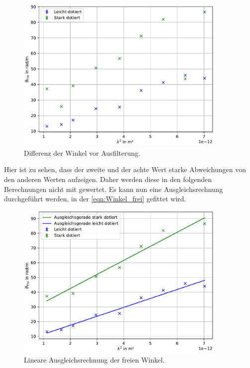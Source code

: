 \begin{figure}[H]
    \centering
    \includegraphics[width=0.9\textwidth]{../Rohplot.pdf}
    \caption{Differenz der Winkel vor Ausfilterung.}
    \label{fig:pre}
\end{figure}

\noindent Hier ist zu sehen, dass der zweite und der achte Wert starke Abweichungen von den anderen Werten 
aufzeigen. Daher werden diese in den folgenden Berechnungen nicht mit gewertet. Es kann nun eine Ausgleichsrechnung 
durchgeführt werden, in der \autoref{eqn:Winkel_frei} gefittet wird. 

\begin{figure}[H]
    \centering
    \includegraphics[width=0.9\textwidth]{../LinRegress.pdf}
    \caption{Lineare Ausgleichsrechnung der freien Winkel.}
    \label{fig:LinRegress}
\end{figure}

